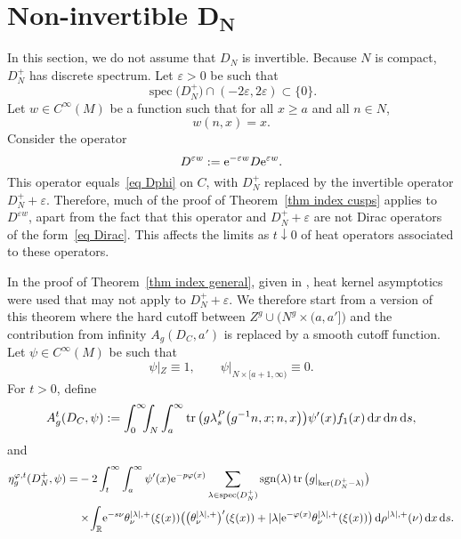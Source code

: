 \documentclass[pdftex]{sigma}%
\numberwithin{equation}{section}
\DeclareMathOperator{\tr}{tr}
\DeclareMathOperator{\spec}{spec}
\DeclareMathOperator{\sgn}{sgn}
\newcommand{\R}{\mathbb{R}}
\begin{document}
\section[Non-invertible D\_N]{Non-invertible $\boldsymbol{D_N}$}\label{sec DN not invtble}\label{sec DN not inv}

In this section, we do not assume that $D_N$ is invertible. Because $N$ is compact, $D_N^+$ has discrete spectrum. Let $\varepsilon>0$ be such that
\begin{equation} \label{eq prop eps}
\spec\big(D_N^+\big) \cap (-2\varepsilon, 2\varepsilon) \subset \{0\}.
\end{equation}
Let $w \in C^{\infty}(M)$ be a function such that for all $x\geq a$ and all $n \in N$,
\begin{equation} \label{eq prop w}
w(n, x) = x.
\end{equation}
Consider the operator
\begin{equation} \label{eq def Depsw}
D^{\varepsilon w} := {\rm e}^{-\varepsilon w} D {\rm e}^{\varepsilon w}.
\end{equation}
This operator
 equals~\eqref{eq Dphi} on $C$, with $D_N^+$ replaced by the invertible operator $D_N^+ +\varepsilon$. Therefore, much of the proof of Theorem~\ref{thm index cusps} applies to $D^{\varepsilon w}$, apart from the fact that this operator and $D_N^+ + \varepsilon$ are not Dirac operators of the form~\eqref{eq Dirac}. This affects the limits as $t \downarrow 0$ of heat operators associated to these operators.

In the proof of Theorem~\ref{thm index general}, given in \cite{HW21a}, heat kernel asymptotics were used that may not apply to $D_N^+ + \varepsilon$. We therefore start from a version of this theorem where the hard cutoff between $Z^g \cup \big(N^g \times (a,a']\big)$ and the contribution from infinity $A_g(D_C, a')$
 is replaced by a smooth cutoff function. Let $\psi \in C^{\infty}(M)$ be such that
 \begin{equation} \label{eq prop psi}
\psi|_Z \equiv 1,\qquad \psi|_{N \times [a+1, \infty)}\equiv 0.
 \end{equation}
 For $t>0$, define
 \[
 A_g^t(D_C, \psi) := \int_0^{\infty}\!\!\!
\int_N \int_a^{\infty} \tr\big(g \lambda_s^{P}\big(g^{-1}n, x; n, x\big)\big) \psi'(x) f_1(x)\, {\rm d}x\, {\rm d}n\, {\rm d}s,
 \]
 and
 \begin{align*} %
\eta^{\varphi, t}_g(D_N^+, \psi) =&-2 \int_{t}^{\infty}
\int_{a}^{\infty} \psi' ( x){\rm e}^{-p\varphi(x)}
\sum_{\lambda \in \spec(D_N^+)}\sgn(\lambda) \tr\big(g|_{\ker(D_N^+ - \lambda)}\big)
\\
&\times\!\int_{\R}\!{\rm e}^{-s\nu}
\theta^{|\lambda|, +}_{\nu} (\xi(x))
 \big( \big(\theta^{|\lambda|, +}_{\nu} \big)'(\xi(x)) +|\lambda| {\rm e}^{-\varphi(x)} \theta^{|\lambda|, +}_{\nu} (\xi(x))
 \big)\,{\rm d}\rho^{|\lambda|, +}(\nu)\, {\rm d}x \, {\rm d}s.
 \end{align*}
\end{document}
